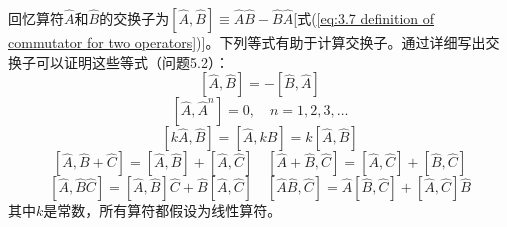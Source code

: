     回忆算符$\hat{A}$和$\hat{B}$的交换子为$\left[\hat{A},\hat{B}\right] \equiv \hat{A}\hat{B} - \hat{B}\hat{A}$[式(\ref{eq:3.7 definition of commutator for two operators})]。下列等式有助于计算交换子。通过详细写出交换子可以证明这些等式（问题5.2）：
    \begin{equation}
        \boxed{
            \left[\hat{A},\hat{B}\right] = -\left[\hat{B},\hat{A}\right]
        }
        \label{eq:5.1}
    \end{equation}
    \begin{equation}
        \boxed{
            \left[\hat{A}, \hat{A}^n\right] = 0, \quad n = 1, 2, 3, \ldots
        }
        \label{eq:5.2}
    \end{equation}
    \begin{equation}
        \boxed{
            \left[k\hat{A},\hat{B}\right] = \left[\hat{A}, k\hat{B}\right] = k\left[\hat{A},\hat{B}\right]
        }
        \label{eq:5.3}
    \end{equation}
    \begin{equation}
        \boxed{
            \left[\hat{A}, \hat{B}+\hat{C}\right] = \left[\hat{A},\hat{B}\right] + \left[\hat{A},\hat{C}\right]
        }
        \quad 
        \boxed{
            \left[\hat{A}+\hat{B},\hat{C}\right] = \left[\hat{A},\hat{C}\right] + \left[\hat{B},\hat{C}\right]
        }
        \label{eq:5.4}
    \end{equation}
    \begin{equation}
        \boxed{
            \left[\hat{A}, \hat{B}\hat{C}\right] = \left[\hat{A},\hat{B}\right]\hat{C} + \hat{B}\left[\hat{A},\hat{C}\right]
        }
        \quad
        \boxed{
            \left[\hat{A}\hat{B},\hat{C}\right] = \hat{A}\left[\hat{B},\hat{C}\right] + \left[\hat{A},\hat{C}\right]\hat{B}
        }
        \label{eq:5.5}
    \end{equation}
    其中$k$是常数，所有算符都假设为线性算符。
